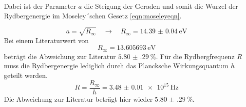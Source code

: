 \newpage
\begin{flushleft}
Dabei ist der Parameter $a$ die Steigung der Geraden und somit die Wurzel der Rydbergenergie im Moseley´schen Gesetz \ref{eqn:moseleyeqn}.
\end{flushleft}
\begin{equation*}
a = \sqrt{R_{\infty}} \quad \to \quad R_{\infty} = \SI{14.39(4)}{\electronvolt}
\end{equation*}
Bei einem Literaturwert von \cite{chemie}
\begin{equation*}
R_{\infty} = \SI{13.605693}{\electronvolt}
\end{equation*}
beträgt die Abweichung zur Literatur $\SI{5.80(29)}{\percent}$.
Für die Rydbergfrequenz $R$ muss die Rydbergenergie lediglich durch das Plancksche Wirkungsquantum $h$ geteilt werden.
\begin{equation*}
R = \frac{R_{\infty}}{h} = \SI{3.48(1)e15}{\hertz}
\end{equation*}
Die Abweichung zur Literatur beträgt hier wieder $\SI{5.80(29)}{\percent}$.
